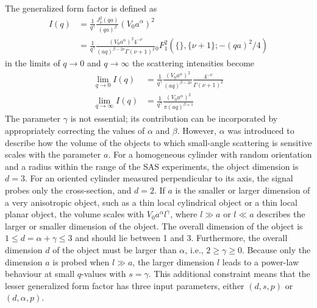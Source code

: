 The generalized form factor is defined as
\begin{align}\label{eq:generalizedFF}
  I(q) &=  \frac{1}{q^\gamma}\frac{J_\nu^2(qa)}{(qa)^\beta} \left(V_0a^\alpha\right)^2 \\
       &=  \frac{1}{q^\gamma}\frac{\left(V_0a^{\alpha}\right)^2 4^{-\nu }}{(a q)^{\beta-2 \nu}\Gamma (\nu +1)^2} {}_0^{\phantom{2}}F^2_1\left(\{\},\{\nu+1\};-(qa)^2/4\right)
\end{align}
in the limits of $q\rightarrow 0$ and $q\rightarrow \infty$ the scattering intensities become
\begin{align}\label{eq:generalizedFFlimits}
\lim_{q\rightarrow 0}      I(q) & = \frac{1}{q^\gamma}\frac{\left(V_0a^{\alpha}\right)^2}{(a q)^{\beta -2\nu}}\frac{4^{-\nu }}{\Gamma (\nu +1)^2} \\
\lim_{q\rightarrow \infty} I(q) & = \frac{1}{q^\gamma}\frac{\left(V_0a^{\alpha}\right)^2}{\pi(aq)^{\beta+1}}
\end{align}
The parameter $\gamma$ is not essential; its contribution can be incorporated by appropriately correcting the values of $\alpha$ and $\beta$. However, $\alpha$ was introduced to describe how the volume of the objects to which small-angle scattering is sensitive scales with the parameter $a$. For a homogeneous cylinder with random orientation and a radius within the range of the SAS experiments, the object dimension is $d=3$. For an oriented cylinder measured perpendicular to its axis, the signal probes only the cross-section, and $d=2$. If $a$ is the smaller or larger dimension of a very anisotropic object, such as a thin local cylindrical object or a thin local planar object, the volume scales with $V_0a^\alpha l^\gamma$, where $l\gg a$ or $l\ll a$ describes the larger or smaller dimension of the object. The overall dimension of the object is $1\leq d=\alpha+\gamma\leq3$ and should lie between 1 and 3. Furthermore, the overall dimension $d$ of the object must be larger than $\alpha$, i.e., $2\geq\gamma\geq0$. Because only the dimension $a$ is probed when $l\gg a$, the larger dimension $l$ leads to a power-law behaviour at small $q$-values with $s=\gamma$. This additional constraint means that the lesser generalized form factor has three input parameters, either $(d,s,p)$ or $(d,\alpha,p)$.
